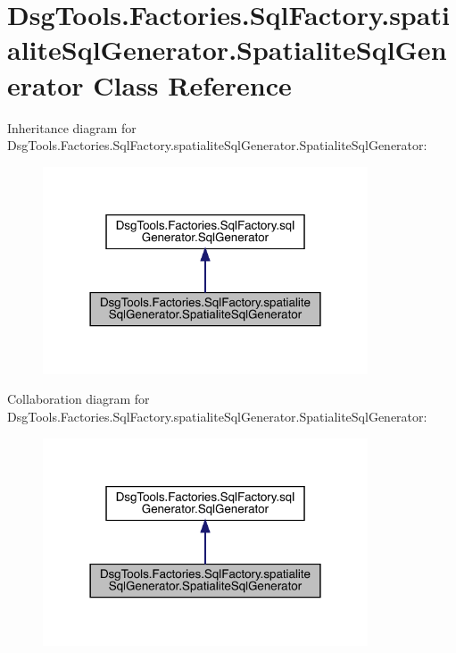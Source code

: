 \hypertarget{class_dsg_tools_1_1_factories_1_1_sql_factory_1_1spatialite_sql_generator_1_1_spatialite_sql_generator}{}\section{Dsg\+Tools.\+Factories.\+Sql\+Factory.\+spatialite\+Sql\+Generator.\+Spatialite\+Sql\+Generator Class Reference}
\label{class_dsg_tools_1_1_factories_1_1_sql_factory_1_1spatialite_sql_generator_1_1_spatialite_sql_generator}


Inheritance diagram for Dsg\+Tools.\+Factories.\+Sql\+Factory.\+spatialite\+Sql\+Generator.\+Spatialite\+Sql\+Generator\+:
\nopagebreak
\begin{figure}[H]
\begin{center}
\leavevmode
\includegraphics[width=273pt]{class_dsg_tools_1_1_factories_1_1_sql_factory_1_1spatialite_sql_generator_1_1_spatialite_sql_generator__inherit__graph}
\end{center}
\end{figure}


Collaboration diagram for Dsg\+Tools.\+Factories.\+Sql\+Factory.\+spatialite\+Sql\+Generator.\+Spatialite\+Sql\+Generator\+:
\nopagebreak
\begin{figure}[H]
\begin{center}
\leavevmode
\includegraphics[width=273pt]{class_dsg_tools_1_1_factories_1_1_sql_factory_1_1spatialite_sql_generator_1_1_spatialite_sql_generator__coll__graph}
\end{center}
\end{figure}
